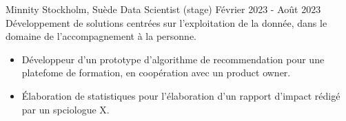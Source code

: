Minnity
Stockholm, Suède
Data Scientist (stage)
Février 2023 - Août 2023
Développement de solutions centrées sur l'exploitation de la donnée, dans le domaine de l'accompagnement à la personne.
\begin{itemize}
	\item  Développeur d'un prototype d'algorithme de recommendation pour une platefome de formation, en coopération avec un product owner.
	\item Élaboration de statistiques pour l'élaboration d'un rapport d'impact rédigé par un spciologue X.
\end{itemize}
